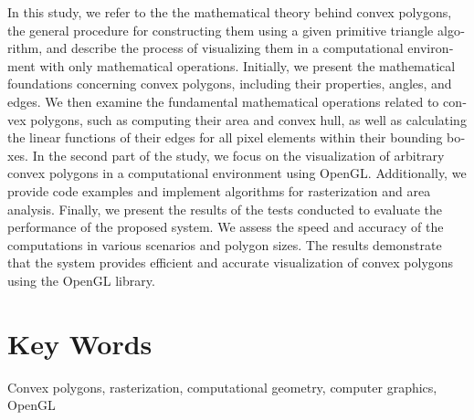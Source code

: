 \textlatin{In this study, we refer to the the mathematical theory behind convex polygons, the general procedure for constructing them using a given primitive triangle algorithm, and describe the process of visualizing them in a computational environment with only mathematical operations. Initially, we present the mathematical foundations concerning convex polygons, including their properties, angles, and edges. We then examine the fundamental mathematical operations related to convex polygons, such as computing their area and convex hull, as well as calculating the linear functions of their edges for all pixel elements within their bounding boxes. In the second part of the study, we focus on the visualization of arbitrary convex polygons in a computational environment using OpenGL. Additionally, we provide code examples and implement algorithms for rasterization and area analysis. Finally, we present the results of the tests conducted to evaluate the performance of the proposed system. We assess the speed and accuracy of the computations in various scenarios and polygon sizes. The results demonstrate that the system provides efficient and accurate visualization of convex polygons using the OpenGL library.}

\vspace{1.5em}

\section*{\textlatin{Key Words}}
\textlatin{Convex polygons, rasterization, computational geometry, computer graphics, OpenGL}
